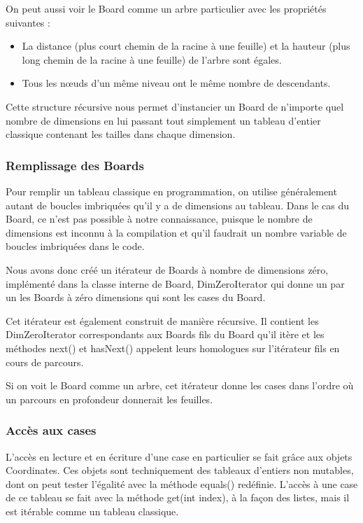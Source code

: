 	On peut aussi voir le Board comme un arbre particulier avec les propriétés suivantes : \newline
		\begin{itemize}
			\item La distance (plus court chemin de la racine à une feuille) et la hauteur (plus long chemin de la racine à une feuille) de l'arbre sont égales.\newline
			\item Tous les nœuds d'un même niveau ont le même nombre de descendants.
		\end{itemize}

	Cette structure récursive nous permet d'instancier un Board de n'importe quel nombre de dimensions en lui passant tout simplement un tableau d'entier classique contenant les tailles dans chaque dimension.

	\subsubsection{Remplissage des Boards}

	Pour remplir un tableau classique en programmation, on utilise généralement autant de boucles imbriquées qu'il y a de dimensions au tableau. Dans le cas du Board, ce n'est pas possible à notre connaissance, puisque le nombre de dimensions est inconnu à la compilation et qu'il faudrait un nombre variable de boucles imbriquées dans le code.\newline
	
	Nous avons donc créé un itérateur de Boards à nombre de dimensions zéro, implémenté dans la classe interne de Board, DimZeroIterator qui donne un par un les Boards à zéro dimensions qui sont les cases du Board. \newline

	Cet itérateur est également construit de manière récursive. Il contient les DimZeroIterator correspondants aux Boards fils du Board qu'il itère et les méthodes next() et hasNext() appelent leurs homologues sur l'itérateur fils en cours de parcours.

	Si on voit le Board comme un arbre, cet itérateur donne les cases dans l'ordre où un parcours en profondeur donnerait les feuilles.

	\subsubsection{Accès aux cases}

	L'accès en lecture et en écriture d'une case en particulier se fait grâce aux objets Coordinates.
Ces objets sont techniquement des tableaux d'entiers non mutables, dont on peut tester l'égalité avec la méthode equals() redéfinie. L'accès à une case de ce tableau se fait avec la méthode get(int index), à la façon des listes, mais il est itérable comme un tableau classique.\newline

